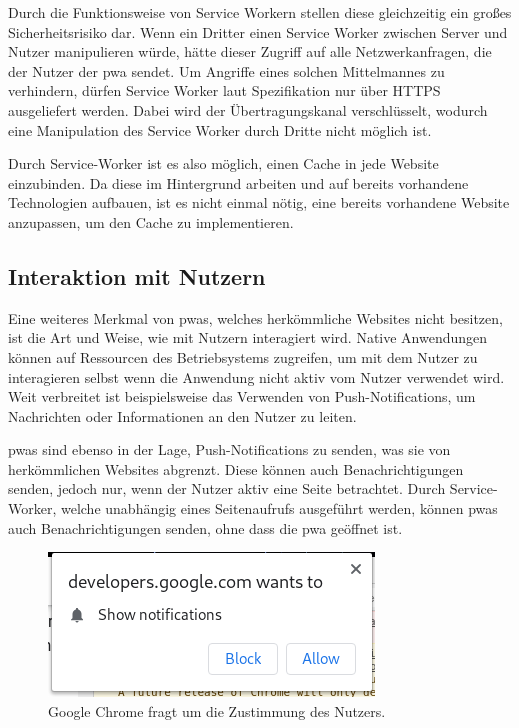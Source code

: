 \documentclass[12pt, parskip=half]{scrartcl}       %
\begin{document}
Durch die Funktionsweise von Service Workern stellen diese gleichzeitig ein großes Sicherheitsrisiko dar.
Wenn ein Dritter einen Service Worker zwischen Server und Nutzer manipulieren würde, hätte dieser Zugriff auf alle Netzwerkanfragen, die der Nutzer der \ac{pwa} sendet.
Um Angriffe eines solchen Mittelmannes zu verhindern, dürfen Service Worker laut Spezifikation nur über HTTPS ausgeliefert werden.
Dabei wird der Übertragungskanal verschlüsselt, wodurch eine Manipulation des Service Worker durch Dritte nicht möglich ist.


Durch Service-Worker ist es also möglich, einen Cache in jede Website einzubinden.
Da diese im Hintergrund arbeiten und auf bereits vorhandene Technologien aufbauen, ist es nicht einmal nötig, eine bereits vorhandene Website anzupassen, um den Cache zu implementieren.


\subsection{Interaktion mit Nutzern}

Eine weiteres Merkmal von \acp{pwa}, welches herkömmliche Websites nicht besitzen, ist die Art und Weise, wie mit Nutzern interagiert wird.
Native Anwendungen können auf Ressourcen des Betriebsystems zugreifen, um mit dem Nutzer zu interagieren selbst wenn die Anwendung nicht aktiv vom Nutzer verwendet wird.
Weit verbreitet ist beispielsweise das Verwenden von Push-Notifications\cite{businessofapps_pushnotificationstatistics}, um Nachrichten oder Informationen an den Nutzer zu leiten.

\acp{pwa} sind ebenso in der Lage, Push-Notifications zu senden, was sie von herkömmlichen Websites abgrenzt.
Diese können auch Benachrichtigungen senden, jedoch nur, wenn der Nutzer aktiv eine Seite betrachtet.
Durch Service-Worker, welche unabhängig eines Seitenaufrufs ausgeführt werden, können \acp{pwa} auch Benachrichtigungen senden, ohne dass die \ac{pwa} geöffnet ist\cite{ejaz_progressive_pushnotifications}.

\begin{figure}[h]
  \centering
  \includegraphics[width=0.4\linewidth]{src/permission-request-chrome.png}
  \caption{Google Chrome fragt um die Zustimmung des Nutzers.}
  \label{fig:chrome_permission}
\end{figure}
\end{document}
